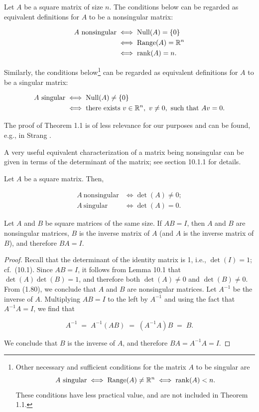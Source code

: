 \begin{theorem}
Let $A$ be a square matrix of size $n$. The conditions below can be
regarded as equivalent definitions for $A$ to be a nonsingular matrix:

\begin{align}
A\ \text{nonsingular} &\iff \mathrm{Null}(A)=\{0\} \\
&\iff \mathrm{Range}(A)=\mathbb{R}^n \\
&\iff \operatorname{rank}(A)=n.
\end{align}

Similarly, the conditions below\footnote{Other necessary and sufficient
conditions for the matrix $A$ to be singular are
\[
A\ \text{singular} \iff \mathrm{Range}(A)\ne\mathbb{R}^n \iff \operatorname{rank}(A)<n.
\]
These conditions have less practical value, and are not included in
Theorem 1.1.} can be regarded as equivalent definitions for $A$ to be a
singular matrix:

\begin{align}
A\ \text{singular} &\iff \mathrm{Null}(A)\ne\{0\} \\
&\iff \text{there exists}\ v\in\R^n,\ v\ne 0,\ \text{such that}\ Av=0.
\end{align}
\end{theorem}

The proof of Theorem 1.1 is of less relevance for our purposes and can be
found, e.g., in Strang \cite{41}.

A very useful equivalent characterization of a matrix being nonsingular
can be given in terms of the determinant of the matrix; see section
10.1.1 for details.

\begin{theorem}
Let $A$ be a square matrix. Then,

\begin{align}
A\ \text{nonsingular} &\iff \det(A)\ne 0; \\
A\ \text{singular} &\iff \det(A)=0.
\end{align}
\end{theorem}

\begin{lemma}
Let $A$ and $B$ be square matrices of the same size. If $AB=I$, then $A$
and $B$ are nonsingular matrices, $B$ is the inverse matrix of $A$ (and
$A$ is the inverse matrix of $B$), and therefore $BA=I$.
\end{lemma}

\begin{proof}
Recall that the determinant of the identity matrix is 1, i.e.,
$\det(I)=1$; cf.\ (10.1). Since $AB=I$, it follows from Lemma 10.1 that
$\det(A)\det(B)=1$, and therefore both $\det(A)\ne 0$ and $\det(B)\ne 0$.
From (1.80), we conclude that $A$ and $B$ are nonsingular matrices. Let
$A^{-1}$ be the inverse of $A$. Multiplying $AB=I$ to the left by
$A^{-1}$ and using the fact that $A^{-1}A=I$, we find that

\[
A^{-1} \;=\; A^{-1}(AB) \;=\; (A^{-1}A)B \;=\; B.
\]

We conclude that $B$ is the inverse of $A$, and therefore
$BA=A^{-1}A=I$.
\end{proof}

